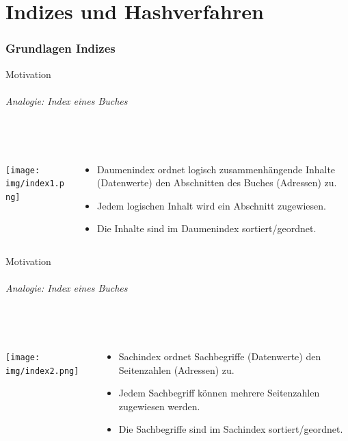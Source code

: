 \part{Indizes und Hashverfahren}

\section{Grundlagen Indizes}

\begin{frame}{Motivation}
\framesubtitle{Analogie: Index eines Buches}
\\[4pt]
\begin{columns}
	\begin{column}{.2\textwidth}
		\texttt{[image: img/index1.png]}
	\end{column}
	\begin{column}{.7\textwidth}
		\begin{itemize}
			\item Daumenindex ordnet logisch zusammenh\"angende Inhalte (Datenwerte) den Abschnitten des Buches (Adressen) zu.
			\item Jedem logischen Inhalt wird ein Abschnitt zugewiesen.
			\item Die Inhalte sind im Daumenindex sortiert/geordnet.
		\end{itemize}
	\end{column}
\end{columns}
\end{frame}

\begin{frame}{Motivation}
\framesubtitle{Analogie: Index eines Buches}
\\[4pt]
\begin{columns}
\begin{column}{.33\textwidth}
	\texttt{[image: img/index2.png]}
\end{column}
\begin{column}{.67\textwidth}
	\begin{itemize}
		\item Sachindex ordnet Sachbegriffe (Datenwerte) den Seitenzahlen (Adressen) zu. 
		\item Jedem Sachbegriff k\"onnen mehrere Seitenzahlen zugewiesen werden.
		\item Die Sachbegriffe sind im Sachindex sortiert/geordnet.
	\end{itemize}
\end{column}
\end{columns}
\end{frame}

